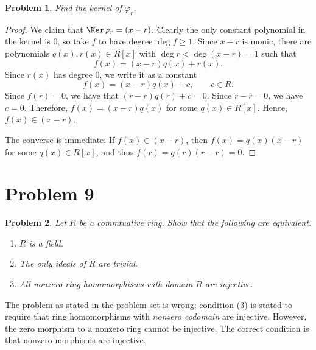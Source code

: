 \documentclass[11pt, letterpaper]{article}
\theoremstyle{plain}
\newtheorem{problem}{Problem}[section]
\begin{document}
\begin{problem}
	Find the kernel of $\varphi _r$.
\end{problem}
\begin{proof}
	We claim that $\Ker \varphi_r =(x-r)$. Clearly the only constant polynomial in the kernel is $0$, so take $f$ to have degree $\operatorname{deg} f\geq 1$. Since $x-r$ is monic, there are polynomials $q(x),r(x)\in R[x]$ with $\operatorname{deg} r < \operatorname{deg} (x-r)=1$ such that
	\[
		f(x) = (x-r)q(x)+r(x)
	.\]
	Since $r(x)$ has degree 0, we write it as a constant
	\[
		f(x)=(x-r)q(x)+c,\qquad c\in R
	.\]
	Since $f(r)=0$, we have that $(r-r)q(r)+c = 0$. Since $r-r=0$, we have $c=0$. Therefore, $f(x)=(x-r)q(x)$ for some $q(x)\in R[x]$. Hence, $f(x)\in (x-r)$.

	The converse is immediate: If $f(x)\in (x-r)$, then $f(x)=q(x)(x-r)$ for some $q(x)\in R[x]$, and thus $f(r)=q(r)(r-r)=0$.
\end{proof}



\section{Problem 9}
\begin{problem}
	Let $R$ be a commtuative ring. Show that the following are equivalent.
	\begin{enumerate}
		\item $R$ is a field.
		\item The only ideals of $R$ are trivial.
		\item All nonzero ring homomorphisms with domain $R$ are injective.
	\end{enumerate}
\end{problem}
\begin{remark}
	The problem as stated in the problem set is wrong; condition (3) is stated to require that ring homomorphisms with \emph{nonzero codomain} are injective. However, the zero morphism to a nonzero ring cannot be injective. The correct condition is that nonzero morphisms are injective.
\end{remark}
\end{document}
